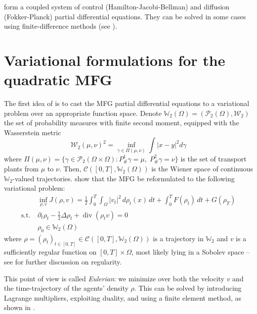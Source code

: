 \documentclass{article}
\newcommand{\WW}{\mathbb{W}}
\newcommand{\calC}{\mathcal{C}}
\newcommand{\calP}{\mathcal{P}}
\newcommand{\calW}{\mathcal{W}}
\newcommand{\suchthat}{\mathrm{s.t.}}
\DeclareMathOperator{\divg}{div}
\numberwithin{equation}{section}
\theoremstyle{definition}
\begin{document}
 form a coupled system of control (Hamilton-Jacobi-Bellman) and diffusion (Fokker-Planck) partial differential equations. They can be solved in some cases using finite-difference methods (see \textcite{achdou:hal-01456506}).

\section{Variational formulations for the quadratic MFG}

The first idea of \cite{benamou:hal-01295299} is to cast the MFG partial differential equations to a variational problem over an appropriate function space. Denote $\WW_2(\Omega) = (\calP_2(\Omega), \calW_2)$ the set of probability measures with finite second moment, equipped with the Wasserstein metric
\begin{equation}\label{eq:Wasserstein2Metric}
   	\calW_2(\mu,\nu)^2 = \inf_{\gamma\in\Pi(\mu,\nu)}
   	\int {|x-y|}^2 d\gamma
\end{equation}
where $\Pi(\mu,\nu) =\{ \gamma \in \calP_2(\Omega\times\Omega) : P^1_{\#}\gamma = \mu,\; P^2_{\#}\gamma = \nu \}$ is the set of transport plants from $\mu$ to $\nu$.
Then, $\mathcal{C}([0, T], \WW_2(\Omega))$ is the Wiener space of continuous $\WW_2$-valued trajectories.
\textcite{benamou:hal-01295299} show that the MFG be reformulated to the following variational problem:
\begin{equation}\label{eq:EulerianProblem}
\begin{aligned}
   	&\inf_{\rho,v} J(\rho, v) =
   	\frac{1}{2}\int_0^T\int_\Omega |v_t|^2 \,d\rho_t(x)\,dt + \int_0^T F(\rho_t)\,dt + G(\rho_T)
   	\\
   	\suchthat\ &\partial_t \rho_t - \frac12\Delta \rho_t + \divg(\rho_t v) = 0 \\
   	&\rho_0 \in \WW_2(\Omega)	
\end{aligned}
\end{equation}
where $\rho = (\rho_t)_{t\in[0,T]}\in \calC([0,T], \WW_2(\Omega))$ is a trajectory in $\WW_2$ and $v$ is a sufficiently regular function on $[0,T] \times \Omega$, most likely lying in a Sobolev space -- see \cite{benamou:hal-01295299} for further discussion on regularity.

This point of view \cite{benamou:hal-01295299} is called \textit{Eulerian}: we minimize over both the velocity $v$ and the time-trajectory of the agents' density $\rho$. This can be solved by introducing Lagrange multipliers, exploiting duality, and using a finite element method, as shown in \cite{benamou:hal-01295299}.
\end{document}
